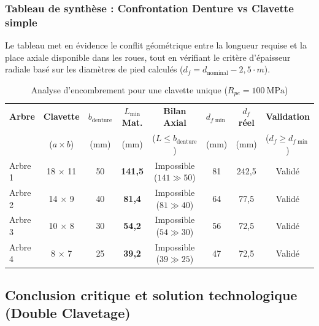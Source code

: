 \documentclass[11pt,a4paper]{article}
\begin{document}
\subsubsection*{Tableau de synthèse : Confrontation Denture vs Clavette simple}
Le tableau met en évidence le conflit géométrique entre la longueur requise et la place axiale disponible dans les roues, tout en vérifiant le critère d'épaisseur radiale basé sur les diamètres de pied calculés ($d_f = d_{\text{nominal}} - 2{,}5 \cdot m$).

\begin{table}[H]
    \centering
    \caption{Analyse d'encombrement pour une clavette unique ($R_{pe} = \qty{100}{\mega\pascal}$)}
    \label{tab:synthese_clavettes_simple}
    \small
    \setlength{\tabcolsep}{4pt}
    \begin{tabular}{l c c c c c c c}
        \toprule
        \textbf{Arbre} & \textbf{Clavette} & \textbf{$b_{\text{denture}}$} & \textbf{$L_{\min}$ Mat.} & \textbf{Bilan Axial} & \textbf{$d_{f\min}$} & \textbf{$d_f$ réel} & \textbf{Validation} \\
                       & ($a \times b$)    & (\unit{\milli\meter})        & (\unit{\milli\meter})    & ($L \le b_{\text{denture}}$) & (\unit{\milli\meter}) & (\unit{\milli\meter}) & ($d_f \ge d_{f\min}$) \\
        \midrule
        Arbre 1 & 18 $\times$ 11 & 50 & \textbf{141{,}5} & Impossible ($141 \gg 50$) & 81 & 242{,}5 & Validé \\
        Arbre 2 & 14 $\times$ 9  & 40 & \textbf{81{,}4}  & Impossible ($81 \gg 40$)  & 64 & 77{,}5  & Validé \\
        Arbre 3 & 10 $\times$ 8  & 30 & \textbf{54{,}2}  & Impossible ($54 \gg 30$)  & 56 & 72{,}5  & Validé \\
        Arbre 4 & 8 $\times$ 7   & 25 & \textbf{39{,}2}  & Impossible ($39 \gg 25$)  & 47 & 72{,}5  & Validé \\
        \bottomrule
    \end{tabular}
\end{table}

\subsection{Conclusion critique et solution technologique (Double Clavetage)}
\end{document}

